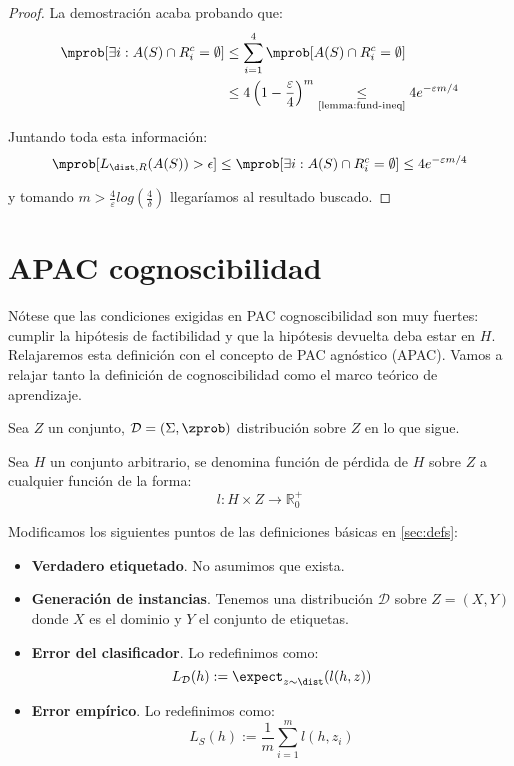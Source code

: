 \begin{example}
\begin{proof}
    La demostración acaba probando que:
    \begin{align*}
    \mprob [\exists i : A(S)\cap R_i^c = \emptyset] &\le \sum_{i=1}^4 \mprob[A(S)\cap R_i^c = \emptyset] \\
                                                    &\le 4 \left(1-\frac{\varepsilon}{4}\right)^m 
                                                    \underset{\textrm{\ref{lemma:fund-ineq}}}{\le} 4e^{-\varepsilon m/4}
    \end{align*}

    Juntando toda esta información: 
    \[
      \mprob[L_{\dist,R}(A(S)) > \epsilon] \le \mprob [\exists i : A(S)\cap R_i^c = \emptyset] \le 4e^{-\varepsilon m/4}
    \]
                                    
    y tomando $m > \frac{4}{\varepsilon} log \left( \frac{4}{\delta} \right)$ llegaríamos al resultado buscado.
    \end{proof}
\end{example}

\section{APAC cognoscibilidad}

Nótese que las condiciones exigidas en PAC cognoscibilidad son muy fuertes: cumplir la hipótesis de factibilidad y que 
la hipótesis devuelta deba estar en $H$. Relajaremos esta definición con el concepto de PAC agnóstico (APAC).
Vamos a relajar tanto la definición de cognoscibilidad como el marco teórico de aprendizaje.

Sea $Z$ un conjunto, $\mathcal{D} = (\Sigma, \zprob)$ distribución sobre $Z$ en lo que sigue.

\begin{definition}
Sea $H$ un conjunto arbitrario, se denomina función de pérdida de $H$ sobre $Z$ a cualquier función de la 
forma:
\[
  l : H \times Z \rightarrow \mathbb{R}_0^{+}
\]
\end{definition}

Modificamos los siguientes puntos de las definiciones básicas en \ref{sec:defs}:

\begin{itemize}
  \item \textbf{Verdadero etiquetado}. No asumimos que exista.
  \item \textbf{Generación de instancias}. Tenemos una distribución $\mathcal{D}$ sobre $Z = (X,Y)$ donde $X$ es el dominio
  y $Y$ el conjunto de etiquetas.
  \item \textbf{Error del clasificador}. Lo redefinimos como:
  \[
    L_{\mathcal{D}}(h) :=  \expect_{z\sim \dist} (l(h,z))
  \]  
  \item \textbf{Error empírico}. Lo redefinimos como:
  \[L_{S} (h) := \frac{1}{m} \sum_{i=1}^m l(h,z_i)\]
\end{itemize}

